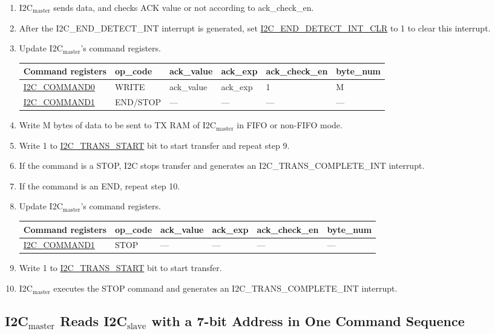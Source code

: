 \documentclass[main\_\_EN.tex]{subfiles}
\begin{document}
\begin{enumerate}
\item I2C$_\text{master}$ sends data, and checks ACK value or not according to ack\_check\_en.

\item After the I2C\_END\_DETECT\_INT interrupt is generated, set \hyperref[fielddesc:I2CENDDETECTINTCLR]{I2C\_END\_DETECT\_INT\_CLR} to 1 to clear this interrupt.
\item Update I2C$_\text{master}$'s command registers.
\begin{longtable}{ | p{4cm} | p{2cm} | p{2cm} | p{2cm} |p{2cm} | p{2cm} |}
\hline\rowcolor{lightgray}
Command registers& op\_code & ack\_value&ack\_exp&ack\_check\_en&byte\_num  \\ \hline
\hyperref[fielddesc:I2CCOMMAND0]{I2C\_COMMAND0} & WRITE& ack\_value&ack\_exp&1&M  \\ \hline
\hyperref[fielddesc:I2CCOMMAND1]{I2C\_COMMAND1} & END/STOP& ---&---&---&---  \\ \hline
\end{longtable}
\item Write M bytes of data to be sent to TX RAM of I2C$_\text{master}$ in FIFO or non-FIFO mode.
\item Write 1 to \hyperref[fielddesc:I2CTRANSSTART]{I2C\_TRANS\_START} bit to start transfer and repeat step 9.
\item If the command is a STOP, I2C stops transfer and generates an I2C\_TRANS\_COMPLETE\_INT interrupt.
\item If the command is an END, repeat step 10.
\item Update I2C$_\text{master}$'s command registers.
\begin{longtable}{ | p{4cm} | p{2cm} | p{2cm} | p{2cm} |p{2cm} | p{2cm} |}
\hline\rowcolor{lightgray}
Command registers & op\_code & ack\_value&ack\_exp&ack\_check\_en&byte\_num  \\ \hline
\hyperref[fielddesc:I2CCOMMAND1]{I2C\_COMMAND1} & STOP& ---&---&---&---  \\ \hline
\end{longtable}
\item Write 1 to \hyperref[fielddesc:I2CTRANSSTART]{I2C\_TRANS\_START}  bit to start transfer.
\item I2C$_\text{master}$ executes the STOP command and generates an I2C\_TRANS\_COMPLETE\_INT  interrupt.

\end{enumerate}

\subsection{\texorpdfstring{I2C$_\text{master}$ Reads I2C$_\text{slave}$ with a 7-bit Address in One Command Sequence}{I2C master Reads I2C slave with a 7-bit Address in One Command Sequence}}
\end{document}
